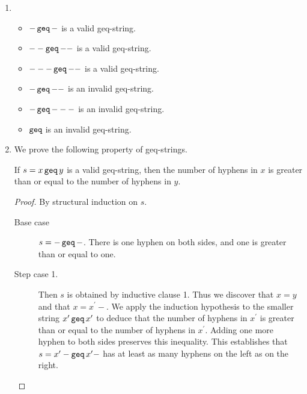 \documentclass[11pt,letterpaper]{article}
\begin{document}
\begin{enumerate}
    \item
        \begin{itemize}
            \item
                $- \operatorname{\mathtt{geq}} -$ is a valid geq-string.
            \item
                $-- \operatorname{\mathtt{geq}} --$ is a valid geq-string.
            \item
                $--- \operatorname{\mathtt{geq}} --$ is a valid geq-string.
            \item
                $- \operatorname{\mathtt{geq}} --$ is an invalid geq-string.
            \item
                $- \operatorname{\mathtt{geq}} ---$ is an invalid geq-string.
            \item
                $\operatorname{\mathtt{geq}}$ is an invalid geq-string.
        \end{itemize}

    \item
        We prove the following property of geq-strings.

        \begin{prop}
            If $s = x \operatorname{\mathtt{geq}} y$ is a valid geq-string, then the number of hyphens
            in $x$ is greater than or equal to the number of hyphens in $y$.
        \end{prop}

        \begin{proof}
            By structural induction on $s$.

            \begin{description}
                \item[Base case] $s = - \operatorname{\mathtt{geq}} -$.
                    There is one hyphen on both sides, and one is greater than
                    or equal to one.

                \item[Step case 1.]
                    Then $s$ is obtained by inductive clause 1.
                    Thus we discover that $x = y$ and that $x = x^\prime -$.
                    We apply the induction hypothesis to the smaller string
                    $x^\prime \operatorname{\mathtt{geq}} x^\prime$ to deduce that the number of
                    hyphens in $x^\prime$ is greater than or equal to the
                    number of hyphens in $x^\prime$.
                    Adding one more hyphen to both sides preserves this
                    inequality.
                    This establishes that $s = x^\prime - \operatorname{\mathtt{geq}} x^\prime -$
                    has at least as many hyphens on the left as on the right.


\end{description}
\end{proof}
\end{enumerate}
\end{document}
